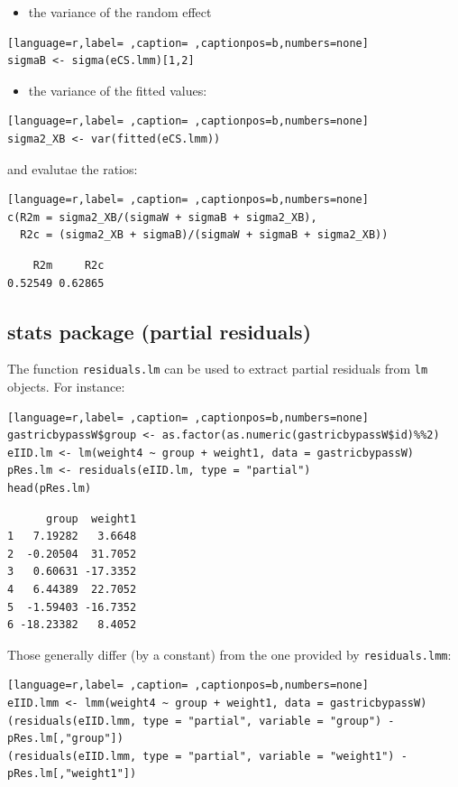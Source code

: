 \documentclass[12pt]{article}
\begin{document}
\begin{itemize}
\item the variance of the random effect
\end{itemize}
\begin{lstlisting}[language=r,label= ,caption= ,captionpos=b,numbers=none]
sigmaB <- sigma(eCS.lmm)[1,2]
\end{lstlisting}

\begin{itemize}
\item the variance of the fitted values:
\end{itemize}
\begin{lstlisting}[language=r,label= ,caption= ,captionpos=b,numbers=none]
sigma2_XB <- var(fitted(eCS.lmm))
\end{lstlisting}

and evalutae the ratios:
\begin{lstlisting}[language=r,label= ,caption= ,captionpos=b,numbers=none]
c(R2m = sigma2_XB/(sigmaW + sigmaB + sigma2_XB),
  R2c = (sigma2_XB + sigmaB)/(sigmaW + sigmaB + sigma2_XB))
\end{lstlisting}

\begin{verbatim}
    R2m     R2c 
0.52549 0.62865
\end{verbatim}

\subsection{stats package (partial residuals)}
\label{sec:org11a9abe}

The function \texttt{residuals.lm} can be used to extract partial residuals
from \texttt{lm} objects. For instance:
\begin{lstlisting}[language=r,label= ,caption= ,captionpos=b,numbers=none]
gastricbypassW$group <- as.factor(as.numeric(gastricbypassW$id)%%2)
eIID.lm <- lm(weight4 ~ group + weight1, data = gastricbypassW)
pRes.lm <- residuals(eIID.lm, type = "partial")
head(pRes.lm)
\end{lstlisting}

\begin{verbatim}
      group  weight1
1   7.19282   3.6648
2  -0.20504  31.7052
3   0.60631 -17.3352
4   6.44389  22.7052
5  -1.59403 -16.7352
6 -18.23382   8.4052
\end{verbatim}


Those generally differ (by a constant) from the one provided by
\texttt{residuals.lmm}:
\begin{lstlisting}[language=r,label= ,caption= ,captionpos=b,numbers=none]
eIID.lmm <- lmm(weight4 ~ group + weight1, data = gastricbypassW)
(residuals(eIID.lmm, type = "partial", variable = "group") - pRes.lm[,"group"])
(residuals(eIID.lmm, type = "partial", variable = "weight1") - pRes.lm[,"weight1"])
\end{lstlisting}
\end{document}
